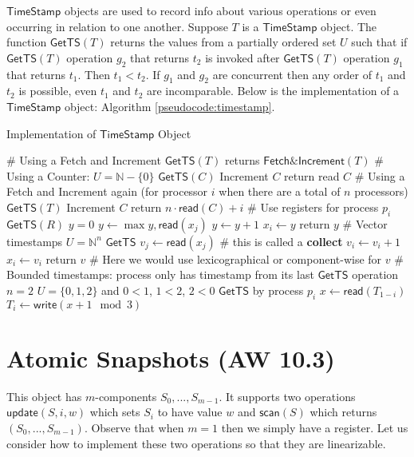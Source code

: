 \documentclass[twoside]{article}
\newcommand\readF{\mathsf{read}}
\newcommand\writeF{\mathsf{write}}
\newcommand\timestamp{\mathsf{TimeStamp}}
\newcommand\GetTS{\mathsf{GetTS}}
\newcommand\N{\mathbb{N}}
\newcommand\updateF{\mathsf{update}}
\newcommand\scanF{\mathsf{scan}}
\begin{document}
$\timestamp$ objects are used to record info about various operations or even occurring in relation to one another. Suppose $T$ is a $\timestamp$ object. The function $\mathsf{GetTS}(T)$ returns the values from a partially ordered set $U$ such that if $\GetTS(T)$ operation $g_2$ that returns $t_2$ is invoked after $\GetTS(T)$ operation $g_1$ that returns $t_1$. Then $t_1 < t_2$. If $g_1$ and $g_2$ are concurrent then any order of $t_1$ and $t_2$ is possible, even $t_1$ and $t_2$ are incomparable. Below is the implementation of a $\timestamp$ object: Algorithm \ref{pseudocode:timestamp}.
\begin{algorithm}
	\caption{Implementation of $\timestamp$ Object}
    \label{pseudocode:timestamp}
    \begin{algorithmic}[1]
	\State \# Using a Fetch and Increment
	\State $\GetTS(T)$
	\State returns $\mathsf{Fetch\&Increment}(T)$
	\State
	\State \# Using a Counter: $U = \N - \{0\}$
	\State $\GetTS(C)$
	\State Increment $C$
	\State return read $C$
	\State
	\State \# Using a Fetch and Increment again (for processor $i$ when there are a total of $n$ processors) 
	\State $\GetTS(T)$
	\State Increment $C$
	\State return $n \cdot \readF(C) + i$
	\State
	\State \# Use registers for process $p_i$
	\State $\GetTS(R)$
	\State $y = 0$
		\State $y \leftarrow \max{y, \readF(x_j)}$
	\EndFor
	\State $y \leftarrow y + 1$
	\State $x_i \leftarrow y$
	\State return $y$
	\State
	\State \# Vector timestamps $U = \N^n$
	\State $\GetTS$	
		\State $v_j \leftarrow \readF(x_j)$ \# this is called a \textbf{collect}
	\EndFor
	\State $v_i \leftarrow v_i + 1$
	\State $x_i \leftarrow v_i$
	\State return $v$
	\State \# Here we would use lexicographical or component-wise for $v$
	\State
	\State \# Bounded timestamps: process only has timestamp from its last $\GetTS$ operation
	\State $n = 2$
	\State $U = \{0, 1, 2\}$ and $0 < 1$, $1 < 2$, $2 < 0$
	\State $\GetTS$ by process $p_i$
	\State $x \leftarrow \readF(T_{1-i})$
	\State $T_i \leftarrow \writeF(x + 1 \mod 3)$
    \end{algorithmic}
\end{algorithm}

\section{Atomic Snapshots (AW 10.3)}
This object has $m$-components $S_0, ..., S_{m-1}$. It supports two operations $\updateF(S, i, w)$ which sets $S_i$ to have value $w$ and $\scanF(S)$ which returns $(S_0, ..., S_{m-1})$. Observe that when $m = 1$ then we simply have a register. Let us consider how to implement these two operations so that they are linearizable. 
\end{document}
